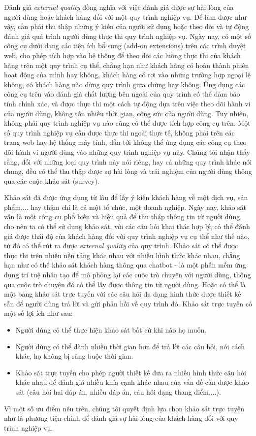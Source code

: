 Đánh giá \emph{external quality} đồng nghĩa với việc đánh giá được sự hài lòng của người dùng hoặc khách hàng đối với một quy trình nghiệp vụ. Để làm được như vậy, cần phải thu thập những ý kiến của người sử dụng hoặc theo dõi và tự động đánh giá quá trình người dùng thực thi quy trình nghiệp vụ. Ngày nay, có một số công cụ dưới dạng các tiện ích bổ sung (add-on extensions) trên các trình duyệt web, cho phép tích hợp vào hệ thống để theo dõi các luồng thực thi của khách hàng trên một quy trình cụ thể, chẳng hạn như khách hàng có hoàn thành phiên hoạt động của mình hay không, khách hàng có rơi vào những trường hợp ngoại lệ không, có khách hàng nào dừng quy trình giữa chừng hay không.
Ứng dụng các công cụ trên vào đánh giá chất lượng bên ngoài của quy trình có thể đảm bảo tính chính xác, và được thực thi một cách tự động dựa trên việc theo dõi hành vi của người dùng, không tốn nhiều thời gian, công sức của người dùng. Tuy nhiên, không phải quy trình nghiệp vụ nào cũng có thể được tích hợp công cụ trên. Một số quy trình nghiệp vụ cần được thực thi ngoài thực tế, không phải trên các trang web hay hệ thống máy tính, dẫn tới không thể ứng dụng các công cụ theo dõi hành vi người dùng vào những quy trình nghiệp vụ này. Chúng tôi nhận thấy rằng, đối với những loại quy trình này nói riêng, hay cả những quy trình khác nói chung, đều có thể thu thập được sự hài lòng và trải nghiệm của người dùng thông qua các cuộc khảo sát (survey).
\par
Khảo sát đã được ứng dụng từ lâu để lấy ý kiến khách hàng về một dịch vụ, sản phẩm,... hay thậm chí là cả một tổ chức, một doanh nghiệp. Ngày nay, khảo sát vẫn là một công cụ phổ biến và hiệu quả để thu thập thông tin từ người dùng, cho nên ta có thể sử dụng khảo sát, với các câu hỏi khai thác hợp lý, có thể đánh giá được thái độ của khách hàng đối với quy trình nghiệp vụ cụ thể như thế nào, từ đó có thể rút ra được \emph{external quality} của quy trình. Khảo sát có thể được thực thi trên nhiều nền tảng khác nhau với nhiều hình thức khác nhau, chẳng hạn như có thể khảo sát khách hàng thông qua chatbot - là một phần mềm ứng dụng trí tuệ nhân tạo để mô phỏng lại các cuộc trò chuyện với người dùng, thông qua cuộc trò chuyện đó có thể lấy được thông tin từ người dùng. Hoặc có thể là một bảng khảo sát trực tuyến với các câu hỏi đa dạng hình thức được thiết kế sẵn để người dùng trả lời và gửi phản hồi về quy trình đó. Khảo sát trực tuyến có một số lợi ích như sau:
\begin{itemize}
    \item Người dùng có thể thực hiện khảo sát bất cứ khi nào họ muốn.
    \item Người dùng có thể dành nhiều thời gian hơn để trả lời các câu hỏi, nói cách khác, họ không bị ràng buộc thời gian.
    \item Khảo sát trực tuyến cho phép người thiết kế đưa ra nhiều hình thức câu hỏi khác nhau để đánh giá nhiều khía cạnh khác nhau của vấn đề cần được khảo sát (câu hỏi hai đáp án, nhiều đáp án, câu hỏi dạng thang điểm,...).
\end{itemize}
\par
Vì một số ưu điểm nêu trên, chúng tôi quyết định lựa chọn khảo sát trực tuyến như là phương tiện chính để đánh giá sự hài lòng của khách hàng đối với quy trình nghiệp vụ.